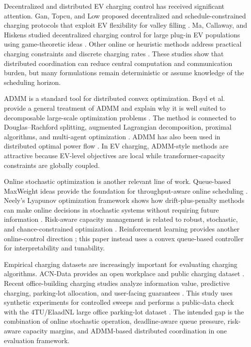 \documentclass[journal]{IEEEtran}
\begin{document}
Decentralized and distributed EV charging control has received significant attention. Gan, Topcu, and Low proposed decentralized and schedule-constrained charging protocols that exploit EV flexibility for valley filling \cite{Gan2013,Gan2013Allerton}. Ma, Callaway, and Hiskens studied decentralized charging control for large plug-in EV populations using game-theoretic ideas \cite{Ma2013}. Other online or heuristic methods address practical charging constraints and discrete charging rates \cite{Alonso2014,Masoum2015,Lee2021Discrete}. These studies show that distributed coordination can reduce central computation and communication burden, but many formulations remain deterministic or assume knowledge of the scheduling horizon.

ADMM is a standard tool for distributed convex optimization. Boyd et al. provide a general treatment of ADMM and explain why it is well suited to decomposable large-scale optimization problems \cite{Boyd2011}. The method is connected to Douglas--Rachford splitting, augmented Lagrangian decomposition, proximal algorithms, and multi-agent optimization \cite{Eckstein1992,Gabay1976,Parikh2014,Nedic2009}. ADMM has also been used in distributed optimal power flow \cite{DallAnese2013,Erseghe2014}. In EV charging, ADMM-style methods are attractive because EV-level objectives are local while transformer-capacity constraints are globally coupled.

Online stochastic optimization is another relevant line of work. Queue-based MaxWeight ideas provide the foundation for throughput-aware online scheduling \cite{Tassiulas1992,Tassiulas1993,Georgiadis2006,Stolyar2004}. Neely's Lyapunov optimization framework shows how drift-plus-penalty methods can make online decisions in stochastic systems without requiring future information \cite{Neely2010}. Risk-aware capacity management is related to robust, stochastic, and chance-constrained optimization \cite{Bertsimas2004,Bertsimas2011,BenTal2009,Shapiro2014,Nemirovski2006,Calafiore2006,Campi2008}. Reinforcement learning provides another online-control direction \cite{Sutton2018,Watkins1992,Mnih2015}; this paper instead uses a convex queue-based controller for interpretability and tunability.

Empirical charging datasets are increasingly important for evaluating charging algorithms. ACN-Data provides an open workplace and public charging dataset \cite{Lee2019}. Recent office-building charging studies analyze information value, predictive charging, parking-lot allocation, and user-facing guarantees \cite{Winschermann2023Value,Hoogsteen2023Robust,Arias2023Parking,Winschermann2023Guarantees}. This study uses synthetic experiments for controlled sweeps and performs a public-data check with the 4TU/ElaadNL large office parking-lot dataset \cite{DeBont2025ElaadOffice}. The intended gap is the combination of online stochastic operation, deadline-aware queue pressure, risk-aware capacity margins, and ADMM-based distributed coordination in one evaluation framework.
\end{document}
